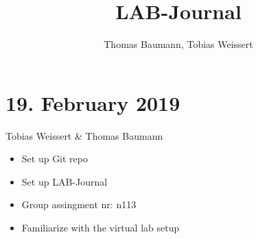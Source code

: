 \documentclass{report}
\title{LAB-Journal}
\author{Thomas Baumann, Tobias Weissert}
\begin{document}
\maketitle
\pagebreak
\section*{19. February 2019}
	Tobias Weissert \& Thomas Baumann
	\begin{itemize}
		\item Set up Git repo
		\item Set up LAB-Journal
		\item Group assingment nr: n113
		\item Familiarize with the virtual lab setup
	\end{itemize}
\end{document}
